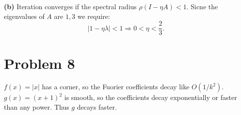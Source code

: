 \documentclass[11pt]{article}
\begin{document}
\textbf{(b)} 
Iteration converges if the spectral radius $\rho(I - \eta A) < 1$. Sicne the eigenvalues of $A$ are $1,3$ we require:
\[
|1-\eta \lambda| < 1 \Rightarrow 0 < \eta < \frac{2}{3}.
\]

\section*{Problem 8}

$f(x)=|x|$ has a corner, so the Fuorier coefficients decay like $O(1/k^2)$.  
$g(x)=(x+1)^2$ is smooth, so the coefficients decay  exponentially or faster than any power. Thus $g$ decays faster.
\end{document}
